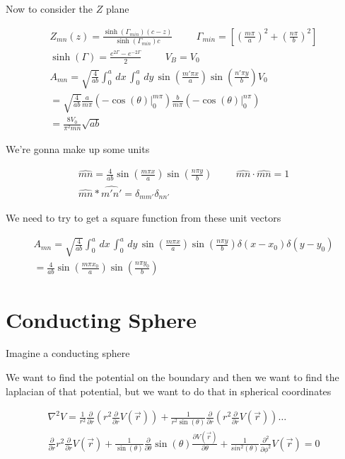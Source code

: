 \documentclass[fleqn]{report}
\newcommand{\hp}{\hspace{1cm}}
\newcommand{\del}{\partial}
\newcommand{\equations} [1] {
\begin{gather*}
#1
\end{gather*}
}
\begin{document}
Now to consider the $Z$ plane 
\equations{
    Z_{mn}(z)
    =
    \frac{\sinh(\Gamma_{min})(c - z)}{\sinh(\Gamma_{min}) c}
    \hp 
    \Gamma_{min} 
    =
    \left[
        (\frac{m \pi}{a})^2 + 
        (\frac{n \pi}{b})^2
    \right]
    \\
    \sinh(\Gamma) = \frac{e^{2 \Gamma} - e^{-2 \Gamma}}{2}
    \hp 
    V_B = V_0
    \\
    A_{mn}
    =
    \sqrt{\frac{4}{ab}}
    \int^a_0 \, dx \,
    \int^a_0 \, dy \,
    \sin(\frac{m' \pi x}{a})
    \sin(\frac{n' \pi y}{b})
    V_0
    \\
    =
    \sqrt{\frac{4}{ab}}
    \frac{a}{m \pi}
    \left(
        - \cos(\theta) \Big|^{m \pi}_{0}
    \right)
    \frac{b}{m \pi}
    \left(
        - \cos(\theta) \Big|^{n \pi}_{0}
    \right)
    \\
    =
    \frac{8 V_0}{\pi^2 m n} \sqrt{ab}
}

We're gonna make up some units
\equations{
    \hat{mn}
    =
    \frac{4}{ab} 
    \sin(\frac{m \pi x}{a})
    \sin(\frac{n \pi y}{b})
    \hp 
    \hat{mn} \cdot \hat{mn} = 1
    \\
    \hat{mn} * \hat{m'n'} = \delta_{mm'} \delta_{nn'}
}
We need to try to get a square function from these unit vectors 
\equations{
    A_{mn}
    =
    \sqrt{\frac{4}{ab}}
    \int^a_0 \, dx \,
    \int^a_0 \, dy \,
    \sin(\frac{m \pi x}{a})
    \sin(\frac{n \pi y}{b})
    \delta(x - x_0)
    \delta(y - y_0)
    \\
    =
    \frac{4}{ab}
    \sin(\frac{m \pi x_0}{a})
    \sin(\frac{n \pi y_0}{b})
}

\section{Conducting Sphere}
Imagine a conducting sphere 

We want to find the potential on the boundary and then we 
want to find the laplacian of that potential, but we want 
to do that in spherical coordinates 
\equations{
    \nabla^2 V 
    =
    \frac{1}{r^2}
    \frac{\del}{\del r}
    \left(
        r^2
    \frac{\del}{\del r}
    V(\vec r)
    \right)
    +
    \frac{1}{r^2 \sin(\theta)}
    \frac{\del}{\del r}
    \left(
        r^2
    \frac{\del}{\del r}
    V(\vec r)
    \right)
    \ldots 
    \\
    \frac{\del}{\del r}
    r^2 
    \frac{\del}{\del r}
    V(\vec r)
    +
    \frac{1}{\sin(\theta)}
    \frac{\del}{\del \theta}
    \sin(\theta)
    \frac{\del V(\vec r)}{\del \theta}
    +
    \frac{1}{sin^2(\theta)}
    \frac{\del^2}{\del \phi^2}
    V(\vec r)
    = 0
}
\end{document}
